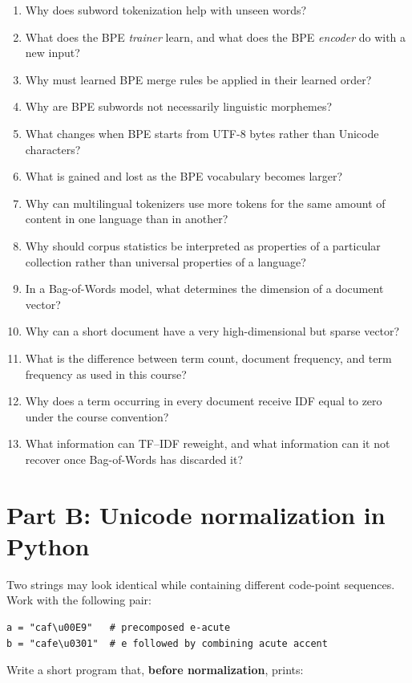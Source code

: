 \documentclass[11pt,a4paper]{article}
\begin{document}
\begin{enumerate}
  \item Why does subword tokenization help with unseen words?
  \item What does the BPE \emph{trainer} learn, and what does the BPE \emph{encoder} do with a new input?
  \item Why must learned BPE merge rules be applied in their learned order?
  \item Why are BPE subwords not necessarily linguistic morphemes?
  \item What changes when BPE starts from UTF-8 bytes rather than Unicode characters?
  \item What is gained and lost as the BPE vocabulary becomes larger?
  \item Why can multilingual tokenizers use more tokens for the same amount of content in one language than in another?
  \item Why should corpus statistics be interpreted as properties of a particular collection rather than universal properties of a language?
  \item In a Bag-of-Words model, what determines the dimension of a document vector?
  \item Why can a short document have a very high-dimensional but sparse vector?
  \item What is the difference between term count, document frequency, and term frequency as used in this course?
  \item Why does a term occurring in every document receive IDF equal to zero under the course convention?
  \item What information can TF--IDF reweight, and what information can it not recover once Bag-of-Words has discarded it?
\end{enumerate}

\section{Part B: Unicode normalization in Python}

Two strings may look identical while containing different code-point sequences. Work with the following pair:

\begin{lstlisting}
a = "caf\u00E9"   # precomposed e-acute
b = "cafe\u0301"  # e followed by combining acute accent
\end{lstlisting}

Write a short program that, \textbf{before normalization}, prints:
\end{document}
